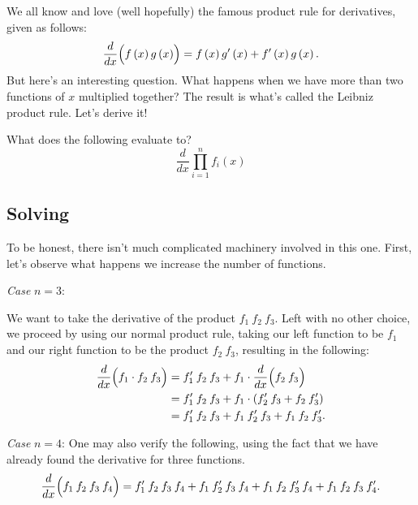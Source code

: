 We all know and love (well hopefully) the famous product rule for derivatives, given as follows:
\[
    \frac{d}{dx} \Bigl( f \left( x \right) g \left( x \right) \Bigr) = f \left( x \right) g' \left( x \right) + f' \left( x \right) g \left( x \right)
.\]
But here's an interesting question. What happens when we have more than two
functions of \( x \) multiplied together? The result is what's called the
Leibniz product rule. Let's derive it!

\begin{blackbox}
    \begin{problem}
        What does the following evaluate to?
        \[
            \frac{d}{dx} \prod_{i = 1}^{n} f_i \left( x \right)
        \]
    \end{problem}
\end{blackbox}

\subsection{Solving}

To be honest, there isn't much complicated machinery involved in this one. First, let's observe what happens we increase the number of functions.

\textit{Case} \( n = 3 \):

We want to take the derivative of the product \( f_1 \> f_2 \> f_3 \).  Left with no other choice, we proceed by using our normal product rule, taking our left function to be \( f_1 \) and our right function to be the product \( f_2 \> f_3 \), resulting in the following:
\begin{align*}
    \frac{d}{dx} \Bigl( f_1 \cdot f_2 \> f_3 \Bigr) &= f_1' \> f_2 \> f_3 + f_1 \cdot \frac{d}{dx} \Bigl( f_2 \> f_3 \Bigr) \\
    &= f_1' \> f_2 \> f_3 + f_1 \cdot \left( f_2' \> f_3 + f_2 \> f_3' \right) \\
    &= f_1' \> f_2 \> f_3 + f_1 \> f_2' \> f_3 + f_1 \> f_2 \> f_3'
.\end{align*}

\textit{Case} \( n = 4 \):
One may also verify the following, using the fact that we have already found the derivative for three functions.
\[
    \frac{d}{dx} \Bigl( f_1 \> f_2 \> f_3 \> f_4 \Bigr) = f_1' \> f_2 \> f_3 \> f_4 + f_1 \> f_2' \> f_3 \> f_4 + f_1 \> f_2 \> f_3' \> f_4 + f_1 \> f_2 \> f_3 \> f_4'
.\]

